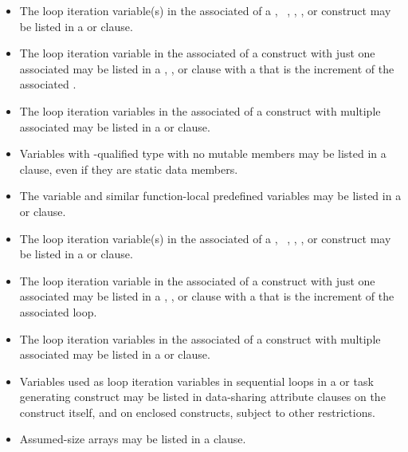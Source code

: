 \begin{ccppspecific}
\begin{itemize}
\item The loop iteration variable(s) in the associated  of
      a , ~, , ,
      or  construct may be listed in a  or 
       clause.
\item The loop iteration variable in the associated  of a 
       construct with just one associated  may be 
      listed in a , , or  clause 
      with a  that is the increment of the associated .
\item The loop iteration variables in the associated  of a 
       construct with multiple associated  may be 
      listed in a  or  clause.
\item Variables with -qualified type with no mutable members may 
      be listed in a  clause, even if they are static data members.
\item The  variable and similar function-local
      predefined variables may be listed in a  or
       clause.
\end{itemize}
\end{ccppspecific}

\begin{fortranspecific}
\begin{itemize}
\item The loop iteration variable(s) in the associated  of a 
      , ~, , ,
      or  construct may be listed in a  or 
       clause.
\item The loop iteration variable in the associated  of a  
      construct with just one associated  may be listed in a 
      , , or  clause with a 
       that is the increment of the associated loop.
\item The loop iteration variables in the associated  of a 
       construct with multiple associated  may be 
      listed in a  or  clause.
\item Variables used as loop iteration variables in sequential loops in a 
       or task generating construct may be listed in 
      data-sharing attribute clauses on the construct itself, and on
      enclosed constructs, subject to other restrictions.
\item Assumed-size arrays may be listed in a  clause.
\end{itemize}
\end{fortranspecific}

